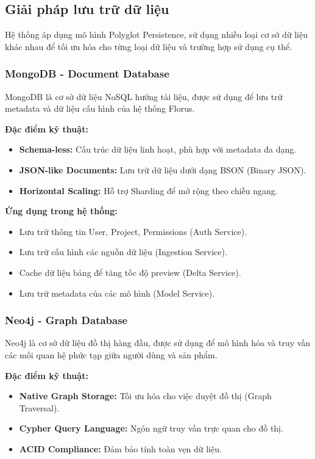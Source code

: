 \subsection{Giải pháp lưu trữ dữ liệu}

Hệ thống áp dụng mô hình Polyglot Persistence, sử dụng nhiều loại cơ sở dữ liệu khác nhau để tối ưu hóa cho từng loại dữ liệu và trường hợp sử dụng cụ thể.

\subsubsection{MongoDB - Document Database}

MongoDB là cơ sở dữ liệu NoSQL hướng tài liệu, được sử dụng để lưu trữ metadata và dữ liệu cấu hình của hệ thống Florus.

\textbf{Đặc điểm kỹ thuật:}
\begin{itemize}
    \item \textbf{Schema-less:} Cấu trúc dữ liệu linh hoạt, phù hợp với metadata đa dạng.
    \item \textbf{JSON-like Documents:} Lưu trữ dữ liệu dưới dạng BSON (Binary JSON).
    \item \textbf{Horizontal Scaling:} Hỗ trợ Sharding để mở rộng theo chiều ngang.
\end{itemize}

\textbf{Ứng dụng trong hệ thống:}
\begin{itemize}
    \item Lưu trữ thông tin User, Project, Permissions (Auth Service).
    \item Lưu trữ cấu hình các nguồn dữ liệu (Ingestion Service).
    \item Cache dữ liệu bảng để tăng tốc độ preview (Delta Service).
    \item Lưu trữ metadata của các mô hình (Model Service).
\end{itemize}

\subsubsection{Neo4j - Graph Database}

Neo4j là cơ sở dữ liệu đồ thị hàng đầu, được sử dụng để mô hình hóa và truy vấn các mối quan hệ phức tạp giữa người dùng và sản phẩm.

\textbf{Đặc điểm kỹ thuật:}
\begin{itemize}
    \item \textbf{Native Graph Storage:} Tối ưu hóa cho việc duyệt đồ thị (Graph Traversal).
    \item \textbf{Cypher Query Language:} Ngôn ngữ truy vấn trực quan cho đồ thị.
    \item \textbf{ACID Compliance:} Đảm bảo tính toàn vẹn dữ liệu.
\end{itemize}


